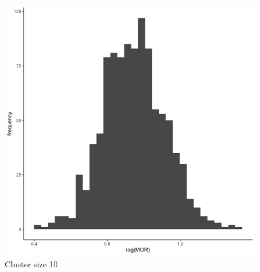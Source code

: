 \documentclass[
  letterpaper,
  DIV=11,
  numbers=noendperiod,
  titlepage]{scrartcl}
\begin{document}
\begin{figure}
\begin{minipage}[t]{0.24\linewidth}
{{\includegraphics{../../plots/two-lvl-ran-slope/high-prev/hist_100_10_two_lvl_slp_high_prev_q3.png}

}

\caption{Cluster size 10}

}

\end{minipage}%
%
\begin{minipage}[t]{0.24\linewidth}

{\centering 

}
\end{minipage}
\end{figure}
\end{document}
